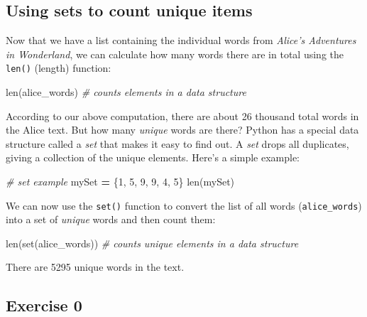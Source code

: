 \documentclass[]{book}
\newenvironment{Shaded}{\begin{snugshade}}{\end{snugshade}}
\newcommand{\DecValTok}[1]{\textcolor[rgb]{0.00,0.00,0.81}{#1}}
\newcommand{\CommentTok}[1]{\textcolor[rgb]{0.56,0.35,0.01}{\textit{#1}}}
\newcommand{\OperatorTok}[1]{\textcolor[rgb]{0.81,0.36,0.00}{\textbf{#1}}}
\newcommand{\BuiltInTok}[1]{#1}
\newcommand{\NormalTok}[1]{#1}
\begin{document}
\subsection{Using sets to count unique
items}\label{using-sets-to-count-unique-items}

Now that we have a list containing the individual words from
\emph{Alice's Adventures in Wonderland}, we can calculate how many words
there are in total using the \texttt{len()} (length) function:

\begin{Shaded}
\begin{Highlighting}[]
\BuiltInTok{len}\NormalTok{(alice_words) }\CommentTok{# counts elements in a data structure}
\end{Highlighting}
\end{Shaded}

According to our above computation, there are about 26 thousand total
words in the Alice text. But how many \emph{unique} words are there?
Python has a special data structure called a \emph{set} that makes it
easy to find out. A \emph{set} drops all duplicates, giving a collection
of the unique elements. Here's a simple example:

\begin{Shaded}
\begin{Highlighting}[]
\CommentTok{# set example}
\NormalTok{mySet }\OperatorTok{=}\NormalTok{ \{}\DecValTok{1}\NormalTok{, }\DecValTok{5}\NormalTok{, }\DecValTok{9}\NormalTok{, }\DecValTok{9}\NormalTok{, }\DecValTok{4}\NormalTok{, }\DecValTok{5}\NormalTok{\}}
\BuiltInTok{len}\NormalTok{(mySet)}
\end{Highlighting}
\end{Shaded}

We can now use the \texttt{set()} function to convert the list of all
words (\texttt{alice\_words}) into a set of \emph{unique} words and then
count them:

\begin{Shaded}
\begin{Highlighting}[]
\BuiltInTok{len}\NormalTok{(}\BuiltInTok{set}\NormalTok{(alice_words)) }\CommentTok{# counts unique elements in a data structure}
\end{Highlighting}
\end{Shaded}

There are 5295 unique words in the text.

\subsection{Exercise 0}\label{exercise-0-3}
\end{document}

